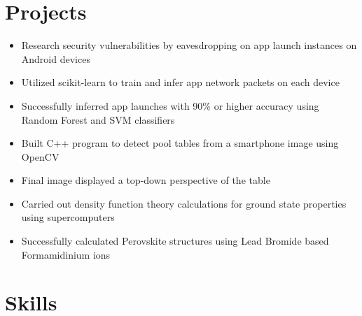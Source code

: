 \documentclass{Custom_CV}
\begin{document}
\section{Projects}
\begin{itemize}[rightmargin=\dimexpr\linewidth-15cm-\leftmargin\relax,noitemsep]
\item Research security vulnerabilities by eavesdropping on app launch instances on Android devices
\item Utilized scikit-learn to train and infer app network packets on each device
\item Successfully inferred app launches with 90\% or higher accuracy using Random Forest and SVM classifiers
\end{itemize}

\begin{itemize}[rightmargin=\dimexpr\linewidth-15cm-\leftmargin\relax,noitemsep]
    \item Built C++ program to detect pool tables from a smartphone image using OpenCV
    \item Final image displayed a top-down perspective of the table
\end{itemize}

\begin{itemize}[rightmargin=\dimexpr\linewidth-15cm-\leftmargin\relax,noitemsep]
\item Carried out density function theory calculations for ground state properties using supercomputers
\item Successfully calculated Perovskite structures using Lead Bromide based Formamidinium ions
\end{itemize}
\section{Skills}
\end{document}
